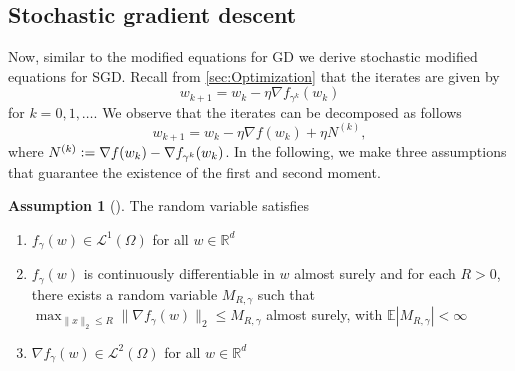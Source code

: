 \documentclass[12pt]{article}
\theoremstyle{definition}
\newtheorem{assumption}[assumption]{Assumption}
\numberwithin{equation}{section}
\newcommand{\norm}[1]{\lVert{#1}\rVert_2}
\newcommand{\defeq}{\vcentcolon=}
\begin{document}
\subsection{Stochastic gradient descent}
\label{sec:smde_sgd}
Now, similar to the modified equations for GD we derive stochastic modified equations for SGD. 
Recall from \autoref{sec:Optimization} that the iterates are given by
\begin{equation*}
  w_{k+1} = w_{k} - \eta \nabla f_{\gamma^k}(w_{k})
\end{equation*}
for $k = 0,1,\dots$. We observe that the iterates can be decomposed as follows
\begin{equation}
  \label{eq:sgd_decomposition}
  w_{k+1} = w_{k} - \eta \nabla f(w_{k}) + \eta N^{(k)},
\end{equation}
where $N^{(k)} \defeq \nabla f(w_{k}) - \nabla f_{\gamma^k}(w_{k})$.
In the following, we make three assumptions that guarantee the existence of the first and second moment.
\begin{assumption}[]
  \label{as:sde_model}
  The random variable satisfies 
  \begin{enumerate}[label=(\roman*)]
    \item $f_{\gamma}(w) \in \mathcal{L}^1(\Omega)$ for all $w \in \mathbb{R}^d$
    \item \label{as:bounded_gradient} $f_{\gamma}(w)$ is continuously differentiable in $w$ almost surely and for each $R > 0$, there exists a random variable $M_{R,\gamma}$ such that $\max_{\norm{x} \leq R} \norm{ \nabla f_{\gamma}(w) } \leq M_{R,\gamma}$ almost surely, with $\mathbb{E} |M_{R,\gamma}| < \infty$
    \item $\nabla f_{\gamma}(w) \in \mathcal{L}^2(\Omega)$ for all $w \in \mathbb{R}^d$
  \end{enumerate}
\end{assumption}
\end{document}
